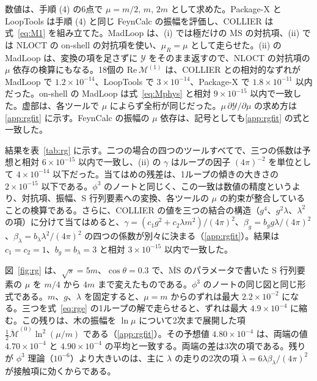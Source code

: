 \documentclass[a4paper,10pt]{ltjsarticle}
\begin{document}
数値は、手順 (4) の6点で $\mu=m/2,\,m,\,2m$ として求めた。Package-X と LoopTools は手順 (4) と同じ FeynCalc の振幅を評価し、COLLIER は式~\eqref{eq:M1} を組み立てた。MadLoop は、(i) では極だけの $\overline{\mathrm{MS}}$ の対抗項、(ii) では NLOCT の on-shell の対抗項を使い、$\mu_R=\mu$ として走らせた。(ii) の MadLoop は、変換の項を足さずに $\mathcal{Y}$ をそのまま返すので、NLOCT の対抗項の $\mu$ 依存の検算にもなる。18個の $\mathrm{Re}\,\mathcal{M}^{(1)}$ は、COLLIER との相対的なずれが MadLoop で $1.2\times10^{-14}$、LoopTools で $3\times10^{-14}$、Package-X で $1.8\times10^{-11}$ 以内だった。on-shell の MadLoop は式~\eqref{eq:Mphys} と相対 $9\times10^{-15}$ 以内で一致した。虚部は、各ツールで $\mu$ によらず全桁が同じだった。$\mu\,\partial \mathcal{Y}/\partial\mu$ の求め方は\ref{app:rgfit} に示す。FeynCalc の振幅の $\mu$ 依存は、記号としても\ref{app:rgfit} の式と一致した。

結果を表~\ref{tab:rg} に示す。二つの場合の四つのツールすべてで、三つの係数は予想と相対 $6\times10^{-15}$ 以内で一致し、(ii) の $\gamma$ はループの因子 $(4\pi)^{-2}$ を単位として $4\times10^{-14}$ 以下だった。当てはめの残差は、1ループの傾きの大きさの $2\times10^{-15}$ 以下である。$\phi^3$ のノートと同じく、この一致は数値の精度というより、対抗項、振幅、S 行列要素への変換、各ツールの $\mu$ の約束が整合していることの検算である。さらに、COLLIER の値を三つの結合の構造（$g^4$、$g^2\lambda$、$\lambda^2$ の項）に分けて当てはめると、$\gamma=(c_1g^2+c_2\lambda m^2)/(4\pi)^2$、$\beta_g=b_gg\lambda/(4\pi)^2$、$\beta_\lambda=b_\lambda\lambda^2/(4\pi)^2$ の四つの係数が別々に決まる（\ref{app:rgfit}）。結果は $c_1=c_2=1$、$b_g=b_\lambda=3$ と相対 $3\times10^{-15}$ 以内で一致した。

図~\ref{fig:rg} は、$\sqrt s=5m$、$\cos\theta=0.3$ で、$\overline{\mathrm{MS}}$ のパラメータで書いた S 行列要素の $\mu$ を $m/4$ から $4m$ まで変えたものである。$\phi^3$ のノートの同じ図と同じ形式である。$m$、$g$、$\lambda$ を固定すると、$\mu=m$ からのずれは最大 $2.2\times10^{-2}$ になる。三つを式~\eqref{eq:rge} の1ループの解で走らせると、ずれは最大 $4.9\times10^{-4}$ に縮む。この残りは、木の振幅を $\ln\mu$ について2次まで展開した項 $\frac12\ddot{\mathcal{M}}^{(0)}\ln^2(\mu/m)$ である（\ref{app:rgfit}）。その予想値 $4.80\times10^{-4}$ は、両端の値 $4.70\times10^{-4}$ と $4.90\times10^{-4}$ の平均と一致する。両端の差は3次の項である。残りが $\phi^3$ 理論（$10^{-6}$）より大きいのは、主に $\lambda$ の走りの2次の項 $\ddot\lambda=6\lambda\beta_\lambda/(4\pi)^2$ が接触項に効くからである。
\end{document}
